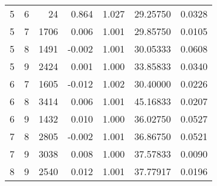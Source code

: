 \begin{longtable}{rrrrrrr}
5 & 6 & 24 & 0.864 & 1.027 & 29.25750 & 0.0328 \\ 
5 & 7 & 1706 & 0.006 & 1.001 & 29.85750 & 0.0105 \\ 
5 & 8 & 1491 & -0.002 & 1.001 & 30.05333 & 0.0608 \\ 
5 & 9 & 2424 & 0.001 & 1.000 & 33.85833 & 0.0340 \\ 
6 & 7 & 1605 & -0.012 & 1.002 & 30.40000 & 0.0226 \\ 
6 & 8 & 3414 & 0.006 & 1.001 & 45.16833 & 0.0207 \\ 
6 & 9 & 1432 & 0.010 & 1.000 & 36.02750 & 0.0527 \\ 
7 & 8 & 2805 & -0.002 & 1.001 & 36.86750 & 0.0521 \\ 
7 & 9 & 3038 & 0.008 & 1.000 & 37.57833 & 0.0090 \\ 
8 & 9 & 2540 & 0.012 & 1.001 & 37.77917 & 0.0196 \\ 
\bottomrule
\end{longtable}

